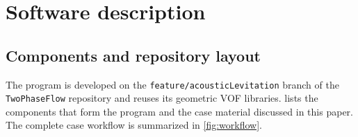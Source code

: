 \documentclass[final,12pt,nopreprintline]{elsarticle}
\newcommand{\code}[1]{\texttt{#1}}
\begin{document}
\section{Software description}
\label{sec:software}

\subsection{Components and repository layout}
\label{sec:components}

The program is developed on the \code{feature/acousticLevitation} branch of
the \code{TwoPhaseFlow} repository \cite{ScheuflerRoenby2023TwoPhaseFlow} and
reuses its geometric VOF libraries.   lists the
components that form the program and the case material discussed in this
paper.  The complete case workflow is summarized in \cref{fig:workflow}.
\end{document}
